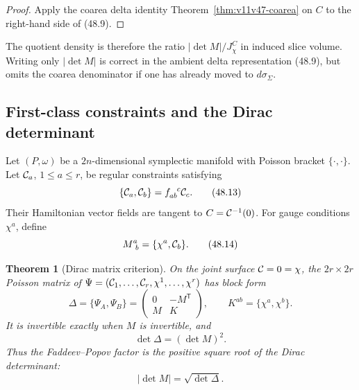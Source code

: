 \documentclass[11pt]{article}
\newtheorem{theorem}{Theorem}[section]
\begin{document}
\begin{proof}
Apply the coarea delta identity
Theorem~\ref{thm:v11v47-coarea} on \(C\) to the right-hand side of
(48.9).
\end{proof}

The quotient density is therefore the ratio
\(|\det M|/J_\chi^C\) in induced slice volume.  Writing only
\(|\det M|\) is correct in the ambient delta representation (48.9),
but omits the coarea denominator if one has already moved to
\(d\sigma_\Sigma\).

\subsection{First-class constraints and the Dirac determinant}

Let \((P,\omega)\) be a \(2n\)-dimensional symplectic manifold with
Poisson bracket \(\{\cdot,\cdot\}\).  Let
\({\cal C}_a\), \(1\le a\le r\), be regular constraints satisfying
\[
                  \{{\cal C}_a,{\cal C}_b\}
                    =f_{ab}^{\ \ c}{\cal C}_c.                \tag{48.13}
\]
Their Hamiltonian vector fields are tangent to
\(C={\cal C}^{-1}(0)\).  For gauge conditions \(\chi^a\), define
\[
                  M^a_{\ b}=\{\chi^a,{\cal C}_b\}.             \tag{48.14}
\]

\begin{theorem}[Dirac matrix criterion]
\label{thm:v11v48-dirac}
On the joint surface \({\cal C}=0=\chi\), the \(2r\times2r\)
Poisson matrix of
\(\Psi=({\cal C}_1,\ldots,{\cal C}_r,\chi^1,\ldots,\chi^r)\)
has block form
\[
 \Delta=\{\Psi_A,\Psi_B\}
 =\begin{pmatrix}
       0&-M^{\mathsf T}\\
       M&K
   \end{pmatrix},\qquad K^{ab}=\{\chi^a,\chi^b\}.              \tag{48.15}
\]
It is invertible exactly when \(M\) is invertible, and
\[
                              \det\Delta=(\det M)^2.           \tag{48.16}
\]
Thus the Faddeev--Popov factor is the positive square root of the
Dirac determinant:
\[
                              |\det M|=\sqrt{\det\Delta}.      \tag{48.17}
\]
\end{theorem}
\end{document}
